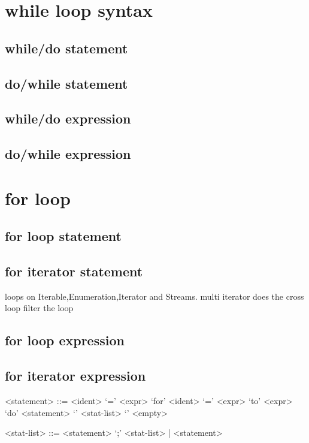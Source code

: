 \documentclass{tufte-book}
\begin{document}
            \section{while loop syntax}
            \subsection{while/do statement}
            \subsection{do/while statement}
            \subsection{while/do expression}
            \subsection{do/while expression}
            \section{for loop}
            \subsection{for loop statement}
            \subsection{for iterator statement}
             loops on Iterable,Enumeration,Iterator and Streams.
             multi iterator does the cross loop
             filter the loop
            \subsection{for loop expression}
            \subsection{for iterator expression}

            \begin{grammar}

            <statement> ::= <ident> `=' <expr> 
            \alt `for' <ident> `=' <expr> `to' <expr> `do' <statement> 
            \alt `{' <stat-list> `}' 
            \alt <empty> 

            <stat-list> ::= <statement> `;' <stat-list> | <statement> 

            \end{grammar}
\end{document}
